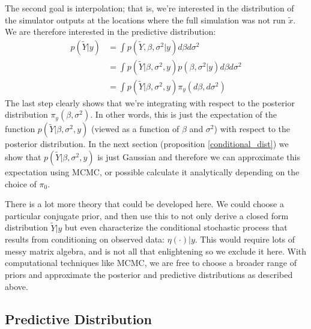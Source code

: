 \documentclass[12pt]{article}
\begin{document}
The second goal is interpolation; that is, we're interested in the distribution of the simulator outputs at the locations where the full simulation was not run $\tilde{x}$. We are therefore interested in 
the predictive distribution: 
\begin{align*}
p(\tilde{Y}|y) &= \int p(\tilde{Y}, \beta, \sigma^2|y) d\beta d\sigma^2 \\
		    &= \int p(\tilde{Y}|\beta, \sigma^2, y)p(\beta, \sigma^2|y) d\beta d\sigma^2 \\
		    &= \int p(\tilde{Y}|\beta, \sigma^2, y) \pi_y(d\beta, d\sigma^2)
\end{align*}
The last step clearly shows that we're integrating with respect to the posterior distribution $\pi_y(\beta, \sigma^2)$. In other words, this is just the expectation of the function
$p(\tilde{Y}|\beta, \sigma^2, y)$ (viewed as a function of $\beta$ and $\sigma^2$) with respect to the posterior distribution. In the next section (proposition \ref{conditional_dist})
we show that $p(\tilde{Y}|\beta, \sigma^2, y)$ is just Gaussian and therefore we can approximate this expectation using MCMC, or possible calculate it analytically depending on the 
choice of $\pi_0$. 

There is a lot more theory that could be developed here. We could choose a particular conjugate prior, and then use this to not only derive a closed form distribution $\tilde{Y}|y$ but even 
characterize the conditional stochastic process that results from conditioning on observed data: $\eta(\cdot)|y$. This would require lots of messy matrix algebra, and is not all that enlightening 
so we exclude it here. With computational techniques like MCMC, we are free to choose a broader range of priors and approximate the posterior and predictive distributions as described above. 

\subsection{Predictive Distribution}
\end{document}
